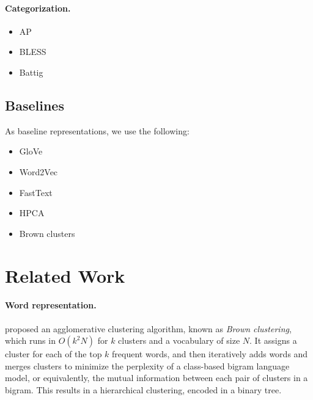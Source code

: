 \documentclass{article}
\begin{document}
    \paragraph{Categorization.}
    
    \begin{itemize}
        \item AP \cite{almuhareb2005concept}
        \item BLESS \cite{baroni2011we}
        \item Battig \cite{battig1969category}
    \end{itemize}
    
    
    \subsection{Baselines}\label{sec:baselinse}
    
    As baseline representations, we use the following:
    
    \begin{itemize}
        \item GloVe \cite{pennington2014glove}
        \item Word2Vec \cite{mikolov2013efficient}
        \item FastText \cite{mikolov2018advances}
        \item HPCA \cite{E14-1051}
        \item Brown clusters \cite{brown1992class}
    \end{itemize}


    \section{Related Work}\label{sec:related_work}

    \paragraph{Word representation.}
    \citet{brown1992class} proposed an agglomerative clustering algorithm,
    known as \textit{Brown clustering},
    which runs in $O(k^2N)$ for $k$ clusters and a vocabulary of size $N$.
    It assigns a cluster for each of the top $k$ frequent words,
    and then iteratively adds words and merges clusters to minimize the
    perplexity of a class-based bigram language model,
    or equivalently, the mutual information between each pair of clusters in a bigram.
    This results in a hierarchical clustering, encoded in a binary tree.
\end{document}
